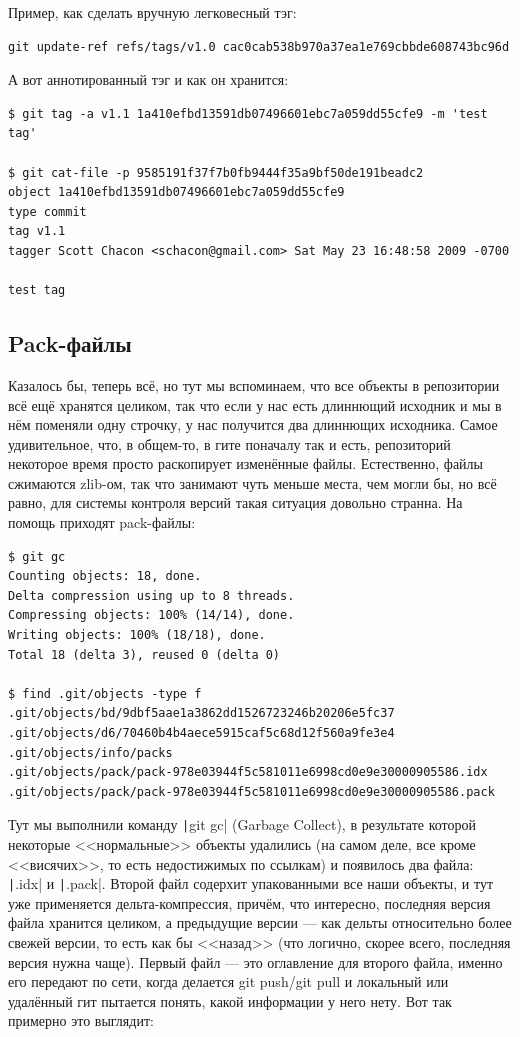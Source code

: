 \documentclass[a5paper]{article}
\begin{document}
Пример, как сделать вручную легковесный тэг:
\begin{verbatim}
git update-ref refs/tags/v1.0 cac0cab538b970a37ea1e769cbbde608743bc96d
\end{verbatim}

А вот аннотированный тэг и как он хранится:
\begin{verbatim}
$ git tag -a v1.1 1a410efbd13591db07496601ebc7a059dd55cfe9 -m 'test tag'

$ git cat-file -p 9585191f37f7b0fb9444f35a9bf50de191beadc2
object 1a410efbd13591db07496601ebc7a059dd55cfe9
type commit
tag v1.1
tagger Scott Chacon <schacon@gmail.com> Sat May 23 16:48:58 2009 -0700

test tag
\end{verbatim}

\subsection{Pack-файлы}

Казалось бы, теперь всё, но тут мы вспоминаем, что все объекты в репозитории всё ещё хранятся целиком, так что если у нас есть длиннющий исходник и мы в нём поменяли одну строчку, у нас получится два длиннющих исходника. Самое удивительное, что, в общем-то, в гите поначалу так и есть, репозиторий некоторое время просто раскопирует изменённые файлы. Естественно, файлы сжимаются zlib-ом, так что занимают чуть меньше места, чем могли бы, но всё равно, для системы контроля версий такая ситуация довольно странна. На помощь приходят pack-файлы:

\begin{verbatim}
$ git gc
Counting objects: 18, done.
Delta compression using up to 8 threads.
Compressing objects: 100% (14/14), done.
Writing objects: 100% (18/18), done.
Total 18 (delta 3), reused 0 (delta 0)

$ find .git/objects -type f
.git/objects/bd/9dbf5aae1a3862dd1526723246b20206e5fc37
.git/objects/d6/70460b4b4aece5915caf5c68d12f560a9fe3e4
.git/objects/info/packs
.git/objects/pack/pack-978e03944f5c581011e6998cd0e9e30000905586.idx
.git/objects/pack/pack-978e03944f5c581011e6998cd0e9e30000905586.pack
\end{verbatim}

Тут мы выполнили команду \texttt|git gc| (Garbage Collect), в результате которой некоторые <<нормальные>> объекты удалились (на самом деле, все кроме <<висячих>>, то есть недостижимых по ссылкам) и появилось два файла: \texttt|.idx| и \texttt|.pack|. Второй файл содерхит упакованными все наши объекты, и тут уже применяется дельта-компрессия, причём, что интересно, последняя версия файла хранится целиком, а предыдущие версии --- как дельты относительно более свежей версии, то есть как бы <<назад>> (что логично, скорее всего, последняя версия нужна чаще). Первый файл --- это оглавление для второго файла, именно его передают по сети, когда делается git push/git pull и локальный или удалённый гит пытается понять, какой информации у него нету. Вот так примерно это выглядит:
\end{document}
